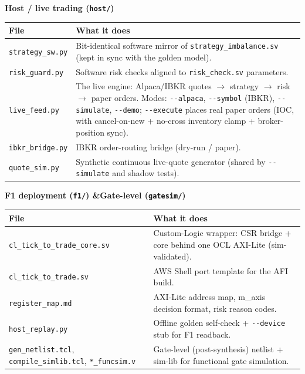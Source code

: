 \documentclass[10pt,a4paper]{article}
\newcommand{\fpath}[1]{\texttt{\textcolor{hdrblue}{#1}}}
\begin{document}
{\bfseries\color{warnamber} Host / live trading (\fpath{host/})}
\vspace{2pt}
\begin{center}\small
\renewcommand{\arraystretch}{1.2}
\begin{tabularx}{\linewidth}{@{}l X@{}}
\toprule
\textbf{File} & \textbf{What it does} \\
\midrule
\fpath{strategy\_sw.py} & Bit-identical software mirror of \fpath{strategy\_imbalance.sv} (kept in sync with the golden model). \\
\fpath{risk\_guard.py}  & Software risk checks aligned to \fpath{risk\_check.sv} parameters. \\
\fpath{live\_feed.py}   & The live engine: Alpaca/IBKR quotes $\to$ strategy $\to$ risk $\to$ paper orders. Modes: \texttt{-{}-alpaca}, \texttt{-{}-symbol} (IBKR), \texttt{-{}-simulate}, \texttt{-{}-demo}; \texttt{-{}-execute} places real paper orders (IOC, with cancel-on-new + no-cross inventory clamp + broker-position sync). \\
\fpath{ibkr\_bridge.py} & IBKR order-routing bridge (dry-run / paper). \\
\fpath{quote\_sim.py}   & Synthetic continuous live-quote generator (shared by \texttt{-{}-simulate} and shadow tests). \\
\bottomrule
\end{tabularx}
\end{center}

{\bfseries\color{hdrblue} F1 deployment (\fpath{f1/}) \quad\&\quad Gate-level (\fpath{gatesim/})}
\vspace{2pt}
\begin{center}\small
\renewcommand{\arraystretch}{1.2}
\begin{tabularx}{\linewidth}{@{}l X@{}}
\toprule
\textbf{File} & \textbf{What it does} \\
\midrule
\fpath{cl\_tick\_to\_trade\_core.sv} & Custom-Logic wrapper: CSR bridge + core behind one OCL AXI-Lite (sim-validated). \\
\fpath{cl\_tick\_to\_trade.sv}      & AWS Shell port template for the AFI build. \\
\fpath{register\_map.md}            & AXI-Lite address map, m\_axis decision format, risk reason codes. \\
\fpath{host\_replay.py}             & Offline golden self-check + \texttt{-{}-device} stub for F1 readback. \\
\fpath{gen\_netlist.tcl}, \fpath{compile\_simlib.tcl}, \fpath{*\_funcsim.v} & Gate-level (post-synthesis) netlist + sim-lib for functional gate simulation. \\
\bottomrule
\end{tabularx}
\end{center}
\end{document}

